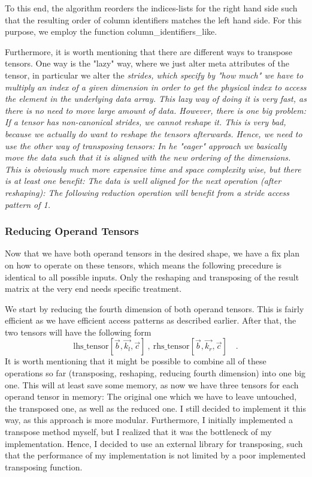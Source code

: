 \documentclass[sigconf]{acmart}
\renewcommand{\texttt}[1]{\begingroup\ttfamily\sloppy\hbadness=10000 #1\endgroup}
\begin{document}
To this end, the algorithm reorders the indices-lists for the right hand side such that the resulting order of column identifiers matches the left hand side. For this purpose, we employ the function \texttt{column\_identifiers\_like}.

Furthermore, it is worth mentioning that there are different ways to transpose tensors. One way is the "lazy" way, where we just alter meta attributes of the tensor, in particular we alter the \em strides\em , which specify by "how much" we have to multiply an index of a given dimension in order to get the physical index to access the element in the underlying data array. This lazy way of doing it is very fast, as there is no need to move large amount of data. However, there is one big problem: If a tensor has non-canonical strides, we cannot reshape it. This is very bad, because we actually do want to reshape the tensors afterwards. Hence, we need to use the other way of transposing tensors: In he "eager" approach we basically move the data such that it is aligned with the new ordering of the dimensions. This is obviously much more expensive time and space complexity wise, but there is at least one benefit: The data is well aligned for the next operation (after reshaping): The following reduction operation will benefit from a stride access pattern of 1.

\subsubsection{Reducing Operand Tensors}
Now that we have both operand tensors in the desired shape, we have a fix plan on how to operate on these tensors, which means the following precedure is identical to all possible inputs. Only the reshaping and transposing of the result matrix at the very end needs specific treatment.

We start by reducing the fourth dimension of both operand tensors. This is fairly efficient as we have efficient access patterns as described earlier. After that, the two tensors will have the following form
\[ \text{lhs\_tensor}[\vec{b}, \vec{k_l}, \vec{c}] \ , \ \text{rhs\_tensor}[\vec{b}, \vec{k_r}, \vec{c}] \quad . \]
It is worth mentioning that it might be possible to combine all of these operations so far (transposing, reshaping, reducing fourth dimension) into one big one. This will at least save some memory, as now we have three tensors for each operand tensor in memory: The original one which we have to leave untouched, the transposed one, as well as the reduced one. I still decided to implement it this way, as this approach is more modular. Furthermore, I initially implemented a transpose method myself, but I realized that it was the bottleneck of my implementation. Hence, I decided to use an external library for transposing, such that the performance of my implementation is not limited by a poor implemented transposing function.
\end{document}
